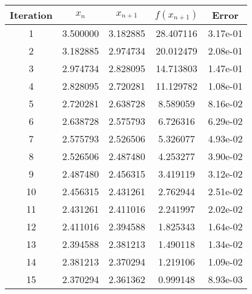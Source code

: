 \begin{tabular}{|c|c|c|c|c|}
\hline
Iteration & $x_n$ & $x_{n+1}$ & $f(x_{n+1})$ & Error \\
\hline
1 & 3.500000 & 3.182885 & 28.407116 & 3.17e-01 \\
\hline
2 & 3.182885 & 2.974734 & 20.012479 & 2.08e-01 \\
\hline
3 & 2.974734 & 2.828095 & 14.713803 & 1.47e-01 \\
\hline
4 & 2.828095 & 2.720281 & 11.129782 & 1.08e-01 \\
\hline
5 & 2.720281 & 2.638728 & 8.589059 & 8.16e-02 \\
\hline
6 & 2.638728 & 2.575793 & 6.726316 & 6.29e-02 \\
\hline
7 & 2.575793 & 2.526506 & 5.326077 & 4.93e-02 \\
\hline
8 & 2.526506 & 2.487480 & 4.253277 & 3.90e-02 \\
\hline
9 & 2.487480 & 2.456315 & 3.419119 & 3.12e-02 \\
\hline
10 & 2.456315 & 2.431261 & 2.762944 & 2.51e-02 \\
\hline
11 & 2.431261 & 2.411016 & 2.241997 & 2.02e-02 \\
\hline
12 & 2.411016 & 2.394588 & 1.825343 & 1.64e-02 \\
\hline
13 & 2.394588 & 2.381213 & 1.490118 & 1.34e-02 \\
\hline
14 & 2.381213 & 2.370294 & 1.219106 & 1.09e-02 \\
\hline
15 & 2.370294 & 2.361362 & 0.999148 & 8.93e-03 \\
\hline
\end{tabular}